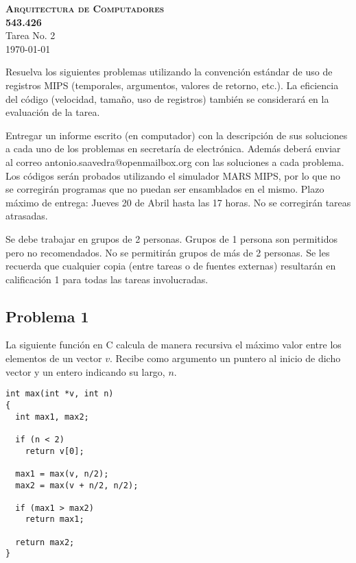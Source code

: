 \documentclass[letterpaper,11pt,notitlepage]{article}
\begin{document}

\begin{center}
\textsc{ \huge \bfseries Arquitectura de Computadores\\[0.2cm] 543.426}\\[0.2cm]
Tarea No. 2\\

\today

\end{center}




Resuelva los siguientes problemas utilizando la convención estándar de uso de registros MIPS (temporales, argumentos, valores de retorno, etc.). La eficiencia del código (velocidad, tamaño, uso de registros) también se considerará en la evaluación de la tarea.

Entregar un informe escrito (en computador) con la descripción de sus soluciones a cada uno de los problemas en secretaría de electrónica. Además deberá enviar al correo antonio.saavedra@openmailbox.org con las soluciones a cada problema. Los códigos serán probados utilizando el simulador MARS MIPS, por lo que no se corregirán programas que no puedan ser ensamblados en el mismo. Plazo máximo de entrega: Jueves 20 de Abril hasta las 17 horas. No se corregirán tareas atrasadas.

Se debe trabajar en grupos de 2 personas. Grupos de 1 persona son permitidos pero no recomendados. No se permitirán grupos de más de 2 personas. Se les recuerda que cualquier copia (entre tareas o de fuentes externas) resultarán en calificación 1 para todas las tareas involucradas.


\subsection*{Problema 1}

La siguiente función en C calcula de manera recursiva el máximo valor entre los elementos de un vector $v$. Recibe como argumento un puntero al inicio de dicho vector y un entero indicando su largo, $n$.


\begin{lstlisting}[style=C]
int max(int *v, int n)
{
  int max1, max2;
  
  if (n < 2)
    return v[0];
  
  max1 = max(v, n/2);
  max2 = max(v + n/2, n/2);
  
  if (max1 > max2)
    return max1;
  
  return max2;
}
\end{lstlisting} 
\end{document}
